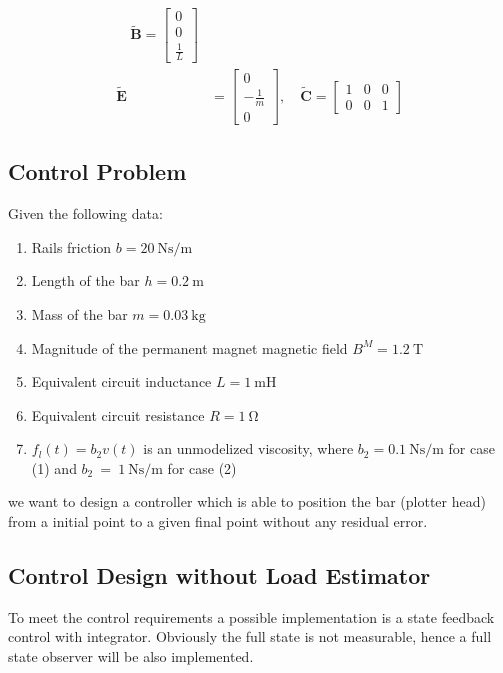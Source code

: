 \documentclass[11pt,a4paper,oneside]{book}
\numberwithin{equation}{section}
\theoremstyle{it}
\theoremstyle{definition}
\begin{document}
\begin{mybox}
\begin{equation*}
\begin{aligned}
			\quad 
			\tilde{\mathbf{B}} = \begin{bmatrix}
				0 \\[6pt]
				0 \\[6pt]
				\frac{1}{L}
			\end{bmatrix} \\[6pt]
			\tilde{\mathbf{E}} &= \begin{bmatrix}
				0 \\[6pt]
				-\frac{1}{m} \\[6pt]
				0
			\end{bmatrix}, \quad \tilde{\mathbf{C}} = 
			\begin{bmatrix}
				1 & 0 & 0 \\[6pt]
				0 & 0 & 1
			\end{bmatrix}
		\end{aligned}
	\end{equation*}
\end{mybox}
\subsection{Control Problem}
Given the following data: 
\begin{enumerate}
	\item Rails friction $b=\SI{20}{\newton\second\per\meter}$
	\item Length of the bar $h=\SI{0.2}{\meter}$	
	\item Mass of the bar $m=\SI{0.03}{\kilogram}$
	\item Magnitude of the permanent magnet magnetic field 
	$B^M=\SI{1.2}{\tesla}$
	\item Equivalent circuit inductance $L=\SI{1}{\milli\henry}$
	\item Equivalent circuit resistance $R=\SI{1}{\ohm}$
	\item $f_l(t)=b_2v(t)$ is an unmodelized viscosity, where 
	$b_2=\SI{0.1}{\newton\second\per\meter}$ for case (1) and 
	$b_2~=~\SI{1}{\newton\second\per\meter}$ for case (2)
\end{enumerate}
we want to design a controller which is able to position the bar (plotter head) 
from a initial point to a given final point without any residual error.
\subsection{Control Design without Load Estimator}
To meet the control requirements a possible implementation is a state feedback 
control with integrator. Obviously the full state is not measurable, hence a 
full state observer will be also implemented.
\end{document}
